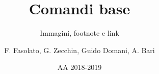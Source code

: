 \title{Comandi base}
\subtitle{Immagini, footnote e link}
\author{F. Fasolato, G. Zecchin, Guido Domani, A. Bari}
\date{AA 2018-2019}

